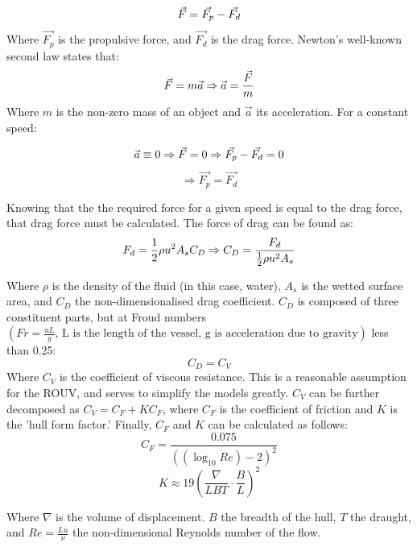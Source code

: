 \documentclass[../main.tex]{subfiles}
\begin{document}
\[
    \vec{F} = \vec{F_{p}} - \vec{F_{d}}\\
\]
Where $\vec{F_{p}}$ is the propulsive force, and $\vec{F_{d}}$ is the drag force.
Newton's well-known second law states that:
\[
    \vec{F}=m\vec{a}\\
    \Rightarrow \vec{a} = \frac{\vec{F}}{m}
\]
Where $m$ is the non-zero mass of an object and $\vec{a}$ its acceleration.
For a constant speed:

\[
    \vec{a} \equiv 0 \Rightarrow \vec{F} = 0\\
    \Rightarrow \vec{F_{p}} - \vec{F_{d}} = 0
\]
\begin{equation}
    \Rightarrow \vec{F_{p}} = \vec{F_{d}}   
\end{equation}


Knowing that the the required force for a given speed is equal to the drag force, that drag force must be calculated.
The force of drag can be found\cite{MANEnergySolutions2023} as:
\begin{equation}
    F_{d} = \frac{1}{2} \rho u^{2} A_{s} C_{D}\\
    \Rightarrow C_{D} = \frac{F_{d}}{\frac{1}{2} \rho u^{2} A_{s}}
\end{equation}

Where $\rho$ is the density of the fluid (in this case, water), $A_{s}$ is the wetted surface area, and $C_{D}$ the non-dimensionalised drag coefficient.
$C_{D}$ is composed of three constituent parts, but at Froud numbers $\left(Fr = \frac{uL}{g}\text{, L is the length of the vessel, g is acceleration due to gravity}\right)$ less than 0.25:
\[C_{D} = C_{V}\]
Where $C_{V}$ is the coefficient of viscous resistance.
This is a reasonable assumption for the ROUV, and serves to simplify the models greatly.
$C_{V}$ can be further decomposed\cite{UnitedStatesNavalAcademy2021}\cite{ITTC2021} as $C_{V} = C_{F} + K C_{F}$, where $C_{F}$ is the coefficient of friction and $K$ is the 'hull form factor.'
Finally, $C_{F}$ and $K$ can be calculated as follows:
\begin{equation}
    C_{F} = \frac{0.075}{\left(\left(\log_{10}{Re}\right)-2\right)^2}
\end{equation}
\begin{equation}
    K \approx 19\left(\frac{\nabla}{LBT} \cdot \frac{B}{L}\right)^{2}
\end{equation}

Where $\nabla$ is the volume of displacement. $B$ the breadth of the hull, $T$ the draught, and $Re=\frac{Lu}{\nu}$ the non-dimensional Reynolds number of the flow.
\end{document}
